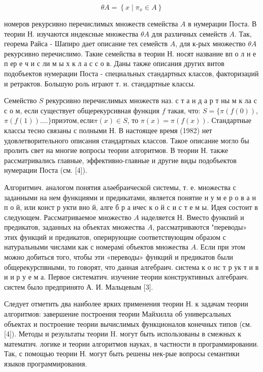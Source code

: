 \documentclass[10pt]{article}
\begin{document}
\[

\theta A=\left\{x \mid \pi_{x} \in A\right\}

\]



номеров рекурсивно перечислимых множеств семейства $A$ в нумерации Поста. В теории Н. изучаются индексные множества $\theta A$ для различных семейств $A$. Так, георема Райса - Шапиро дает описание тех семейств $A$, для к-рых множество $\theta A$ рекурсивно перечислимо. Такие семейства в теории Н. носят название вп о л н е п ер е ч и с ли м ы х к л а с с о в. Даны также описания других витов подобъектов нумерации Поста - специальных стандартных классов, факторизаџий и ретрактов. Большую роль играют т. н. стандартные классы.



Семейство $S$ рекурсивно перечислимых множеств наз. с т а н д а р т ны м к ла с с о м, если существует общерекурсивная функция $f$ такая, что: $S=\{\pi(f(0))$, $\pi(f(1)) \ldots$.$\} при этом, если \pi(x) \in S$, то $\pi(x)=\pi(f(x))$. Стандартные классы тесно связаны с полными Н. В настоящее время (1982) нет удовлетворительного описания стандартных классов. Такое описание могло бы пролить свет на многие вопросы теории алгоритмов. В теории Н. также рассматривались главные, эффективно-главные и другие виды подобъектов нумерации Поста (см. [4]).



Алгоритмич. аналогом понятия аләебраической системы, т. е. множества с заданными на нем функциями и предикатами, является понятие н у м е р о в а н п о й, или конст р укти вно й, алге б р а ичес к о й с и с т е м ы. Идея состоит в следующем. Рассматриваемое множество $A$ наделяется Н. Вместо функпий и предикатов, заданных на объектах множества $A$, рассматриваются "переводы» этих функций и предикатов, оперирующие соответствующим образом с натуральными числами как с номерамі объектов множества $A$. Если при этом можно добиться того, чтобы эти «переводы» функций и предикатов были общерекурспвными, то говорят, что данная алгебраич. система к о нс т р ук т и в и и р у е м а. Первое систематич. изучение теории конструктивных алгебраич. систем было предпринято А. И. Мальцевым [3].



Следует отметить два наиболее ярких применения теории Н. к задачам теории алгоритмов: завершение построения теории Майхилла об универсальных объектах и построение теории вычислимых функционалов конечных типов (см. [4]). Методы и результаты теории H. могут быть использованы в смежных к математич. логике и теории алгоритмов науках, в частности в программировании. Так, с помощью теории Н. могут быть решены нек-рые вопросы семантики языков программирования.
\end{document}
